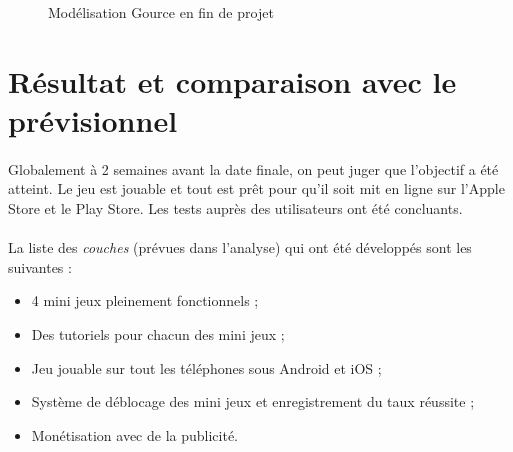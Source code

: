 \begin{figure}[H]\centering
  \caption{Modélisation Gource en fin de projet}
  \label{gource_over}
\end{figure}

\section{Résultat et comparaison avec le prévisionnel}

\paragraph{}
Globalement à 2 semaines avant la date finale, on peut juger que l'objectif a été atteint. 
Le jeu est jouable et tout est prêt pour qu'il soit mit en ligne sur l'Apple Store et le Play Store. Les tests auprès des utilisateurs ont été concluants.

\paragraph{}
La liste des \textit{couches} (prévues dans l'analyse) qui ont été développés sont les suivantes :
\begin{itemize}
\item 4 mini jeux pleinement fonctionnels ;
\item Des tutoriels pour chacun des mini jeux ;
\item Jeu jouable sur tout les téléphones sous Android et iOS ;
\item Système de déblocage des mini jeux et enregistrement du taux réussite ;
\item Monétisation avec de la publicité.
\end{itemize}

